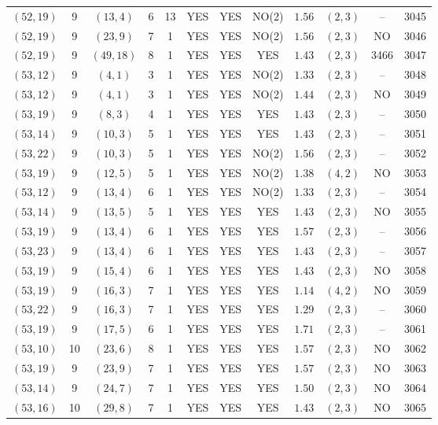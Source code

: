 \begin{longtable}{|c|c|c|c|c|c|c|c|c|c|c|c|}
$(52,19)$ & 9 & $(13,4)$ & 6 & 13 & YES & YES & NO(2) & $1.56$ & $(2,3)$ & -- & 3045\\
$(52,19)$ & 9 & $(23,9)$ & 7 & 1 & YES & YES & NO(2) & $1.56$ & $(2,3)$ & NO & 3046\\
$(52,19)$ & 9 & $(49,18)$ & 8 & 1 & YES & YES & YES & $1.43$ & $(2,3)$ & 3466 & 3047\\
$(53,12)$ & 9 & $(4,1)$ & 3 & 1 & YES & YES & NO(2) & $1.33$ & $(2,3)$ & -- & 3048\\
$(53,12)$ & 9 & $(4,1)$ & 3 & 1 & YES & YES & NO(2) & $1.44$ & $(2,3)$ & NO & 3049\\
$(53,19)$ & 9 & $(8,3)$ & 4 & 1 & YES & YES & YES & $1.43$ & $(2,3)$ & -- & 3050\\
$(53,14)$ & 9 & $(10,3)$ & 5 & 1 & YES & YES & YES & $1.43$ & $(2,3)$ & -- & 3051\\
$(53,22)$ & 9 & $(10,3)$ & 5 & 1 & YES & YES & NO(2) & $1.56$ & $(2,3)$ & -- & 3052\\
$(53,19)$ & 9 & $(12,5)$ & 5 & 1 & YES & YES & NO(2) & $1.38$ & $(4,2)$ & NO & 3053\\
$(53,12)$ & 9 & $(13,4)$ & 6 & 1 & YES & YES & NO(2) & $1.33$ & $(2,3)$ & -- & 3054\\
$(53,14)$ & 9 & $(13,5)$ & 5 & 1 & YES & YES & YES & $1.43$ & $(2,3)$ & NO & 3055\\
$(53,19)$ & 9 & $(13,4)$ & 6 & 1 & YES & YES & YES & $1.57$ & $(2,3)$ & -- & 3056\\
$(53,23)$ & 9 & $(13,4)$ & 6 & 1 & YES & YES & YES & $1.43$ & $(2,3)$ & -- & 3057\\
$(53,19)$ & 9 & $(15,4)$ & 6 & 1 & YES & YES & YES & $1.43$ & $(2,3)$ & NO & 3058\\
$(53,19)$ & 9 & $(16,3)$ & 7 & 1 & YES & YES & YES & $1.14$ & $(4,2)$ & NO & 3059\\
$(53,22)$ & 9 & $(16,3)$ & 7 & 1 & YES & YES & YES & $1.29$ & $(2,3)$ & -- & 3060\\
$(53,19)$ & 9 & $(17,5)$ & 6 & 1 & YES & YES & YES & $1.71$ & $(2,3)$ & -- & 3061\\
$(53,10)$ & 10 & $(23,6)$ & 8 & 1 & YES & YES & YES & $1.57$ & $(2,3)$ & NO & 3062\\
$(53,19)$ & 9 & $(23,9)$ & 7 & 1 & YES & YES & YES & $1.57$ & $(2,3)$ & NO & 3063\\
$(53,14)$ & 9 & $(24,7)$ & 7 & 1 & YES & YES & YES & $1.50$ & $(2,3)$ & NO & 3064\\
$(53,16)$ & 10 & $(29,8)$ & 7 & 1 & YES & YES & YES & $1.43$ & $(2,3)$ & NO & 3065\\

\end{longtable}
